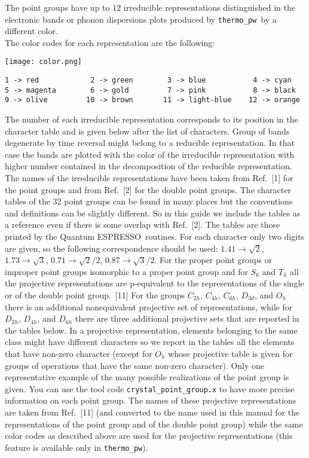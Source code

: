 \documentclass[12pt,a4paper]{article}
\def\qe{{\sc Quantum ESPRESSO}}
\def\thermo{\texttt{thermo\_pw}}
\begin{document}
The point groups have up to $12$ irreducible 
representations distinguished in the electronic bands or phonon dispersions
plots produced by \thermo\ by a different color. \\
The color codes for each representation are the following:
\begin{center}
\texttt{[image: color.png]} 
\end{center}
\begin{verbatim}
1 -> red            2 -> green        3 -> blue           4 -> cyan
5 -> magenta        6 -> gold         7 -> pink           8 -> black
9 -> olive         10 -> brown       11 -> light-blue    12 -> orange
\end{verbatim} 
The number of each irreducible representation corresponds to its position
in the character table and is given below after the list of characters. 
Group of bands degenerate by time reversal might belong to a reducible
representation. In that case the bands are plotted with the color of the
irreducible representation with higher number contained in the decomposition
of the reducible representation.
The names of the irreducible representations have been taken from Ref.~[1]
for the point groups and from Ref.~[2] for the double point groups. 
The character tables of the $32$ point groups can be found in many places 
but the conventions and definitions can be slightly different. So in
this guide we include the tables as a reference even if there is some 
overlap with Ref.~[2]. The tables are those printed by the \qe\ 
routines. For each character only two digits are given, so the
following correspondence should be used:
$1.41 \rightarrow \sqrt{2}$, $1.73 \rightarrow \sqrt{3}$, 
$0.71 \rightarrow \sqrt{2}/2$, $0.87 \rightarrow \sqrt{3}/2$.
For the proper point groups or improper point groups isomorphic to a 
proper point group and for $S_6$ and $T_h$ all the projective 
representations are p-equivalent to the representations of the single 
or of the double point group.~[11] For the groups $C_{2h}$, $C_{4h}$, $C_{6h}$,
$D_{3d}$, and $O_h$ there is an additional nonequivalent projective 
set of representations, while for $D_{2h}$, $D_{4h}$, and $D_{6h}$ there 
are three additional projective sets that are reported in the tables below.
In a projective representation, elements belonging to the 
same class might have different characters so we report in the tables all 
the elements that have non-zero character (except for $O_h$ whose
projective table is given for groups of operations that have the same
non-zero character). 
Only one representative example of the many possible realizations of 
the point group is given. You can use the tool code 
\texttt{crystal\_point\_group.x} to have more precise information
on each point group. The names 
of these projective representations are taken from Ref.~[11] (and converted
to the name used in this manual for the representations of the point group 
and of the double point group) while the same color codes as described above 
are used for the projective representations (this feature is available
only in \texttt{thermo\_pw}).
\end{document}
